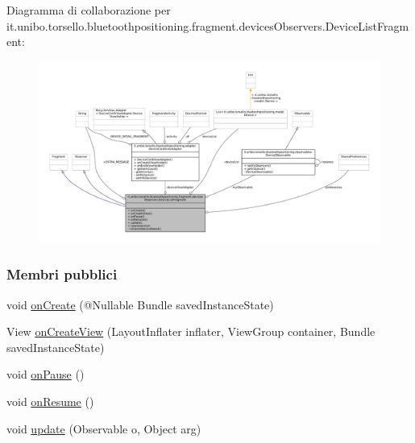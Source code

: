 Diagramma di collaborazione per it.\+unibo.\+torsello.\+bluetoothpositioning.\+fragment.\+devices\+Observers.\+Device\+List\+Fragment\+:
\nopagebreak
\begin{figure}[H]
\begin{center}
\leavevmode
\includegraphics[width=350pt]{classit_1_1unibo_1_1torsello_1_1bluetoothpositioning_1_1fragment_1_1devicesObservers_1_1DeviceListFragment__coll__graph}
\end{center}
\end{figure}
\subsubsection*{Membri pubblici}
\begin{DoxyCompactItemize}
\item 
void \hyperlink{classit_1_1unibo_1_1torsello_1_1bluetoothpositioning_1_1fragment_1_1devicesObservers_1_1DeviceListFragment_a5e548142d1a24ac89205c9e2adac82b6_a5e548142d1a24ac89205c9e2adac82b6}{on\+Create} (@Nullable Bundle saved\+Instance\+State)
\item 
View \hyperlink{classit_1_1unibo_1_1torsello_1_1bluetoothpositioning_1_1fragment_1_1devicesObservers_1_1DeviceListFragment_a7897dd7ea0239d171ec620f65607cc3a_a7897dd7ea0239d171ec620f65607cc3a}{on\+Create\+View} (Layout\+Inflater inflater, View\+Group container, Bundle saved\+Instance\+State)
\item 
void \hyperlink{classit_1_1unibo_1_1torsello_1_1bluetoothpositioning_1_1fragment_1_1devicesObservers_1_1DeviceListFragment_abf68ff973b31bc3d26c1812bffefc2ac_abf68ff973b31bc3d26c1812bffefc2ac}{on\+Pause} ()
\item 
void \hyperlink{classit_1_1unibo_1_1torsello_1_1bluetoothpositioning_1_1fragment_1_1devicesObservers_1_1DeviceListFragment_a8cc0bafb039909424861854606d51b11_a8cc0bafb039909424861854606d51b11}{on\+Resume} ()
\item 
void \hyperlink{classit_1_1unibo_1_1torsello_1_1bluetoothpositioning_1_1fragment_1_1devicesObservers_1_1DeviceListFragment_a9703aa2a0185098c909173d3b49cb448_a9703aa2a0185098c909173d3b49cb448}{update} (Observable o, Object arg)
\end{DoxyCompactItemize}
